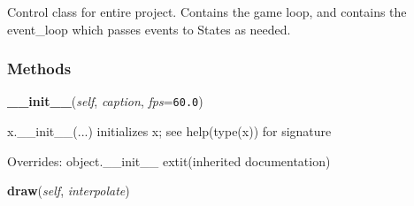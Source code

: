 Control class for entire project. Contains the game loop, and contains the 
event\_loop which passes events to States as needed.



  \subsubsection{Methods}

    \vspace{0.5ex}

\hspace{.8\funcindent}\begin{boxedminipage}{\funcwidth}

    \raggedright \textbf{\_\_init\_\_}(\textit{self}, \textit{caption}, \textit{fps}={\tt 60.0})

\setlength{\parskip}{2ex}
    x.\_\_init\_\_(...) initializes x; see help(type(x)) for signature

\setlength{\parskip}{1ex}
      Overrides: object.\_\_init\_\_ 	extit{(inherited documentation)}

    \end{boxedminipage}

    \label{pygame-asteroids:tools:Control:draw}

    \vspace{0.5ex}

\hspace{.8\funcindent}\begin{boxedminipage}{\funcwidth}

    \raggedright \textbf{draw}(\textit{self}, \textit{interpolate})

\setlength{\parskip}{2ex}
\setlength{\parskip}{1ex}
    \end{boxedminipage}

    \label{pygame-asteroids:tools:Control:event_loop}

    \vspace{0.5ex}

